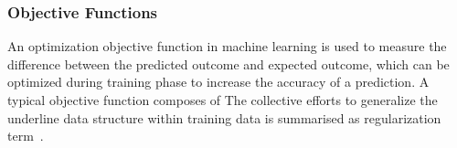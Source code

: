 \subsubsection{Objective Functions}
An optimization objective function in machine learning is used to measure the difference between the predicted outcome and expected outcome, which can be optimized during training phase to increase the accuracy of a prediction. A typical objective function composes of The collective efforts to generalize the underline data structure within training data is summarised as regularization term~\cite{goodfellow_2015}.  